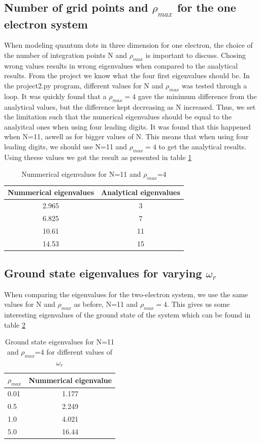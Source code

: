 \documentclass{article}
\begin{document}
\subsection{Number of grid points and $\rho_{max}$ for the one electron system}

When modeling quantum dots in three dimension for one electron, the choice of the number of integration points N and $\rho_{max}$ is important to discuss. Chosing wrong values results in wrong eigenvalues when compared to the analytical results. From the project we know what the four first eigenvalues should be. In the project2.py program, different values for N and $\rho_{max}$ was tested through a loop.
It was quickly found that a $\rho_{max}=4$ gave the minimum difference from the analytical values, but the difference kept decreasing as N increased. Thus, we set the limitation such that the numerical eigenvalues should be equal to the analyitcal ones when using four leading digits. It was found that this happened when N=11, aswell as for bigger values of N. This means that when using four leading digits, we should use N=11 and $\rho_{max}=4$ to get the analytical results. Using theese values we got the result as presented in table \ref{tabelur1}

\begin{table}[H]
    \centering
    \begin{tabular}{|c|c|}
    \hline
     Nummerical eigenvalues & Analytical eigenvalues\\
     \hline
      2.965  &  3\\
      6.825  &  7\\
      10.61  &  11\\
      14.53  &  15\\
     \hline
    \end{tabular}
    \caption{Nummerical eigenvalues for N=11 and $\rho_{max}$=4}
    \label{tabelur1}
\end{table}

\subsection{Ground state eigenvalues for varying $\omega_r$}

When comparing the eigenvalues for the two-electron system, we use the same values for N and $\rho_{max}$ as before, N=11 and $\rho_{max}=4$. This gives us some interesting eigenvalues of the ground state of the system which can be found in table \ref{tabelur2}

\begin{table}[H]
    \centering
    \begin{tabular}{|l|c|}
    \hline
    $\rho_{max}$ & Nummerical eigenvalue \\
    \hline
    0.01 & 1.177  \\
    0.5  & 2.249  \\
    1.0 & 4.021  \\
    5.0 &  16.44  \\
     \hline
    \end{tabular}
    \caption{Ground state eigenvalues for N=11 and $\rho_{max}$=4 for different values of $\omega_r$}
    \label{tabelur2}
\end{table}
\end{document}
